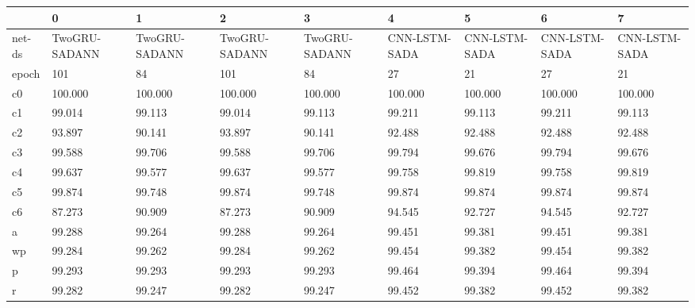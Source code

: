 \begin{tabular}{lllllllll}
\toprule
{} &              0 &              1 &              2 &              3 &              4 &              5 &              6 &              7 \\
\midrule
net-ds &  TwoGRU-SADANN &  TwoGRU-SADANN &  TwoGRU-SADANN &  TwoGRU-SADANN &  CNN-LSTM-SADA &  CNN-LSTM-SADA &  CNN-LSTM-SADA &  CNN-LSTM-SADA \\
epoch  &            101 &             84 &            101 &             84 &             27 &             21 &             27 &             21 \\
c0     &        100.000 &        100.000 &        100.000 &        100.000 &        100.000 &        100.000 &        100.000 &        100.000 \\
c1     &         99.014 &         99.113 &         99.014 &         99.113 &         99.211 &         99.113 &         99.211 &         99.113 \\
c2     &         93.897 &         90.141 &         93.897 &         90.141 &         92.488 &         92.488 &         92.488 &         92.488 \\
c3     &         99.588 &         99.706 &         99.588 &         99.706 &         99.794 &         99.676 &         99.794 &         99.676 \\
c4     &         99.637 &         99.577 &         99.637 &         99.577 &         99.758 &         99.819 &         99.758 &         99.819 \\
c5     &         99.874 &         99.748 &         99.874 &         99.748 &         99.874 &         99.874 &         99.874 &         99.874 \\
c6     &         87.273 &         90.909 &         87.273 &         90.909 &         94.545 &         92.727 &         94.545 &         92.727 \\
a      &         99.288 &         99.264 &         99.288 &         99.264 &         99.451 &         99.381 &         99.451 &         99.381 \\
wp     &         99.284 &         99.262 &         99.284 &         99.262 &         99.454 &         99.382 &         99.454 &         99.382 \\
p      &         99.293 &         99.293 &         99.293 &         99.293 &         99.464 &         99.394 &         99.464 &         99.394 \\
r      &         99.282 &         99.247 &         99.282 &         99.247 &         99.452 &         99.382 &         99.452 &         99.382 \\
\bottomrule
\end{tabular}
